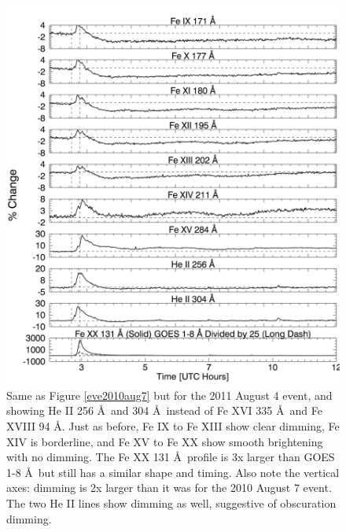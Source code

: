 \newpage
\begin{singlespace}
\begin{figure}[H]
    \begin{center}
	    \includegraphics[width=166mm]{Images/Eve2011Aug4.png}
    \end{center}
    \caption[EVE selected extracted emission lines for 2011 August 4 event]{
        Same as Figure \ref{eve2010aug7} but for the 2011 August 4 event, and showing He II 256 \AA\ and 304 \AA\ instead 
        of Fe XVI 335 \AA\ and Fe XVIII 94 \AA. Just as before, Fe IX to Fe XIII show clear 
        dimming, Fe XIV is borderline, and Fe XV to Fe XX show smooth brightening with no dimming. The Fe XX 131 \AA\ 
        profile is 3x larger than GOES 1-8 \AA\ but still has a similar shape and timing. Also note the 
        vertical axes: dimming is 2x larger than it was for the 2010 August 7 event. The two He II lines show dimming as 
        well, suggestive of obscuration dimming. 
	}
    \label{eve2011aug4}
\end{figure}
\end{singlespace}

